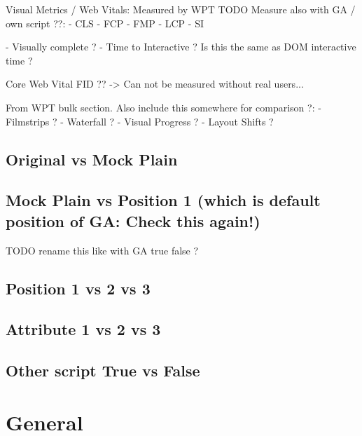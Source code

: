 Visual Metrics / Web Vitals: Measured by WPT
TODO Measure also with GA / own script ??:
- CLS
- FCP
- FMP
- LCP
- SI

- Visually complete ?
- Time  to Interactive ? Is this the same as DOM interactive time ?

Core Web Vital FID ?? -> Can not be measured without real users...

From WPT bulk section. Also include this somewhere for comparison ?:
- Filmstrips ?
- Waterfall ?
- Visual Progress ?
- Layout Shifts ?



\subsection{Original vs Mock Plain}



\subsection{Mock Plain vs Position 1 (which is default position of GA: Check this again!)}
TODO rename this like with GA true false ?



\subsection{Position 1 vs 2 vs 3}



\subsection{Attribute 1 vs 2 vs 3}



\subsection{Other script True vs False}









\section{General}

